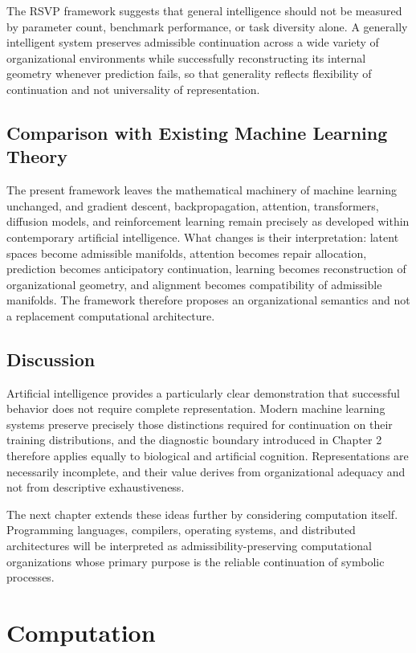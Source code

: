 \documentclass[11pt,oneside]{book}
\numberwithin{equation}{chapter}
\theoremstyle{definition}
\theoremstyle{plain}
\begin{document}
The RSVP framework suggests that general intelligence should not be measured by parameter count, benchmark performance, or task diversity alone. A generally intelligent system preserves admissible continuation across a wide variety of organizational environments while successfully reconstructing its internal geometry whenever prediction fails, so that generality reflects flexibility of continuation and not universality of representation.

\section{Comparison with Existing Machine Learning Theory}

The present framework leaves the mathematical machinery of machine learning unchanged, and gradient descent, backpropagation, attention, transformers, diffusion models, and reinforcement learning remain precisely as developed within contemporary artificial intelligence. What changes is their interpretation: latent spaces become admissible manifolds, attention becomes repair allocation, prediction becomes anticipatory continuation, learning becomes reconstruction of organizational geometry, and alignment becomes compatibility of admissible manifolds. The framework therefore proposes an organizational semantics and not a replacement computational architecture.

\section{Discussion}

Artificial intelligence provides a particularly clear demonstration that successful behavior does not require complete representation. Modern machine learning systems preserve precisely those distinctions required for continuation on their training distributions, and the diagnostic boundary introduced in Chapter 2 therefore applies equally to biological and artificial cognition. Representations are necessarily incomplete, and their value derives from organizational adequacy and not from descriptive exhaustiveness.

The next chapter extends these ideas further by considering computation itself. Programming languages, compilers, operating systems, and distributed architectures will be interpreted as admissibility-preserving computational organizations whose primary purpose is the reliable continuation of symbolic processes.

\chapter{Computation}
\end{document}
